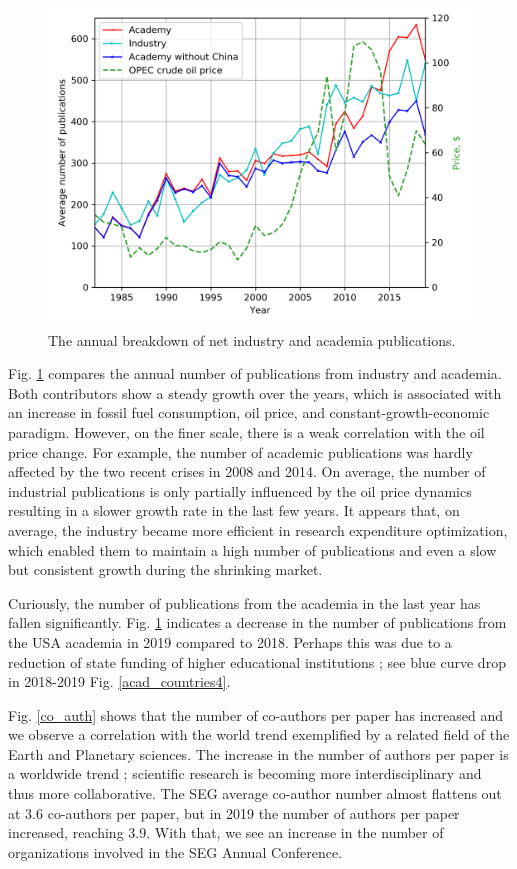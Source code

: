 \documentclass[geosciences,article,submit,moreauthors,pdftex]{Definitions/mdpi}
\begin{document}
\begin{figure}[ht!]
\centering
\includegraphics[scale=0.7]{acad_indus_plot.png}
\caption{The annual breakdown of net industry and academia publications.}
\label{acad_vs_ind}
\end{figure}

Fig. \ref{acad_vs_ind} compares the annual number of publications from industry and academia. Both contributors show a steady growth over the years, which is associated with an increase in fossil fuel consumption, oil price, and constant-growth-economic paradigm. However, on the finer scale, there is a weak correlation with the oil price change. For example, the number of academic publications was hardly affected by the two recent crises in 2008 and 2014. On average, the number of industrial publications is only partially influenced by the oil price dynamics resulting in a slower growth rate in the last few years. It appears that, on average, the industry became more efficient in research expenditure optimization, which enabled them to maintain a high number of publications and even a slow but consistent growth during the shrinking market.

Curiously, the number of publications from the academia in the last year has fallen significantly. Fig. \ref{acad_vs_ind} indicates a decrease in the number of publications from the USA academia in 2019 compared to 2018. Perhaps this was due to a reduction of state funding of higher educational institutions \citep{Brownstein2018}; see blue curve drop in 2018-2019 Fig. \ref{acad_countries4}.


Fig. \ref{co_auth} shows that the number of co-authors per paper has increased and we observe a correlation with the world trend exemplified by a related field of the Earth and Planetary sciences. The increase in the number of authors per paper is a worldwide trend \citep{Mallapaty2018}; scientific research is becoming more interdisciplinary and thus more collaborative. The SEG average co-author number almost flattens out at 3.6 co-authors per paper, but in 2019 the number of authors per paper increased, reaching 3.9. With that, we see an increase in the number of organizations involved in the SEG Annual Conference.
\end{document}

